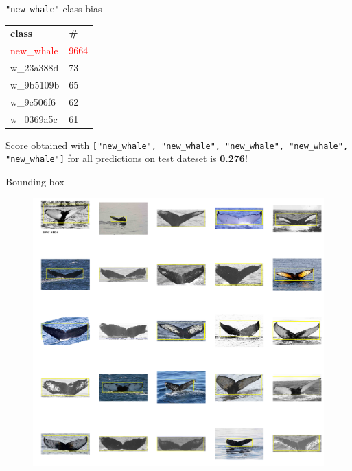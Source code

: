 \begin{frame}[c]{\texttt{"new\_whale"} class bias}
    \Large
    \begin{table}[]
    \begin{tabular}{ll}
    \textbf{class} & \textbf{\#}\\
    \textcolor{red}{new\_whale} &   \textcolor{red}{9664} \\
    w\_23a388d &     73 \\
    w\_9b5109b &     65 \\
    w\_9c506f6 &     62 \\
    w\_0369a5c &     61
    \end{tabular}
    \end{table}
    \normalsize Score obtained with \texttt{["new\_whale", "new\_whale", "new\_whale", "new\_whale", "new\_whale"]} for all predictions on test dateset is \textbf{0.276}!
\end{frame}

\begin{frame}[c]{Bounding box}
    \begin{figure}
        \includegraphics[width=\linewidth]{bounding-box.png}
        \captionsetup{labelformat=empty}
        \caption{}
    \end{figure}
\end{frame}

